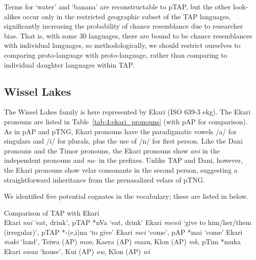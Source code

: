 Terms for `water' and `banana' are reconstructable to pTAP, but the other look-alikes occur only in the restricted geographic subset of the TAP languages, significantly increasing the probability of chance resemblance due to researcher bias. That is, with some 30 languages, there are bound to be chance resemblances with individual languages, so methodologically, we should restrict ourselves to comparing proto-language with proto-language, rather than comparing to individual daughter languages within TAP.

\subsection{Wissel Lakes}
The Wissel Lakes family is here represented by Ekari (ISO 639-3 ekg). The Ekari pronouns are listed in Table~\ref{tab:4:ekari_pronouns} (with pAP for comparison). As in pAP and pTNG, Ekari pronouns have the paradigmatic vowels /a/ for singulars and /i/ for plurals, plus the use of /n/ for first person. Like the Dani pronouns and the Timor pronouns, the Ekari pronouns show \textit{ani} in the independent pronouns and \textit{na-} in the prefixes. Unlike TAP and Dani, however, the Ekari pronouns show velar consonants in the second person, suggesting a straightforward inheritance from the prenasalized velars of pTNG.



We identified five potential cognates in the vocabulary; these are listed in  below.

\enlargethispage{2em}
\ea%
\label{ex:4:59}
\upshape 
  Comparison of TAP with Ekari \citep{Steltenpool1969} \\
  \ea \upshape   Ekari \textit{nai} `eat, drink', pTAP *nVa `eat, drink'
  \ex \upshape  Ekari \textit{menii} `give to him/her/them (irregular)', pTAP *-(e,i)na `to give'
  \ex \upshape  Ekari \textit{mei} `come', pAP *mai `come'
  \ex \upshape  Ekari \textit{maki} `land', Teiwa (AP) \textit{mo{\pharfric}o}\textit{{\textglotstop}}, Kaera (AP) \textit{maxa}, Klon (AP) \textit{m}\textit{{\textschwa}}\textit{k}\textit{{\textepsilon}{\textglotstop}}, pTim *muka
  \ex \upshape  Ekari \textit{owaa} `house', Kui (AP) \textit{ow}, Klon (AP) \textit{{\textschwa}}\textit{wi}
  \z
\z



